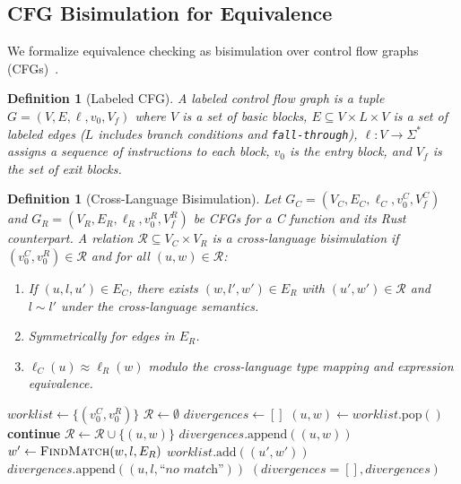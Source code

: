 \documentclass[11pt,a4paper]{article}
\newtheorem{definition}[theorem]{Definition}
\begin{document}
\begin{appendices}
\subsection{CFG Bisimulation for Equivalence}\label{app:bisimulation}

We formalize equivalence checking as bisimulation over control flow
graphs (CFGs)~\cite{park1981concurrency, sangiorgi2011bisimulation}.

\begin{definition}[Labeled CFG]
A labeled control flow graph is a tuple $G = (V, E, \ell, v_0, V_f)$
where $V$ is a set of basic blocks, $E \subseteq V \times L \times V$
is a set of labeled edges ($L$ includes branch conditions and
\texttt{fall-through}), $\ell : V \to \Sigma^*$ assigns a sequence of
instructions to each block, $v_0$ is the entry block, and $V_f$ is the
set of exit blocks.
\end{definition}

\begin{definition}[Cross-Language Bisimulation]
Let $G_C = (V_C, E_C, \ell_C, v_0^C, V_f^C)$ and
$G_R = (V_R, E_R, \ell_R, v_0^R, V_f^R)$ be CFGs for a C function
and its Rust counterpart. A relation $\mathcal{R} \subseteq V_C \times V_R$
is a \emph{cross-language bisimulation} if $(v_0^C, v_0^R) \in \mathcal{R}$
and for all $(u, w) \in \mathcal{R}$:
\begin{enumerate}
  \item If $(u, l, u') \in E_C$, there exists $(w, l', w') \in E_R$ with
    $(u', w') \in \mathcal{R}$ and $l \sim l'$ under the cross-language
    semantics.
  \item Symmetrically for edges in $E_R$.
  \item $\ell_C(u) \approx \ell_R(w)$ modulo the cross-language type
    mapping and expression equivalence.
\end{enumerate}
\end{definition}

\begin{algorithm}[h]
\caption{CFG Bisimulation Check}\label{alg:bisim}
\begin{algorithmic}[1]
  \State $\mathit{worklist} \gets \{(v_0^C, v_0^R)\}$
  \State $\mathcal{R} \gets \emptyset$
  \State $\mathit{divergences} \gets []$
    \State $(u, w) \gets \mathit{worklist}.\text{pop}()$
      \State \textbf{continue}
    \EndIf
    \State $\mathcal{R} \gets \mathcal{R} \cup \{(u, w)\}$
      \State $\mathit{divergences}.\text{append}((u, w))$
    \EndIf
      \State $w' \gets \Call{FindMatch}{w, l, E_R}$
        \State $\mathit{worklist}.\text{add}((u', w'))$
      \Else
        \State $\mathit{divergences}.\text{append}((u, l, \textit{``no match''}))$
      \EndIf
    \EndFor
  \EndWhile
  \State \Return $(\mathit{divergences} = [], \mathit{divergences})$
\EndProcedure
\end{algorithmic}
\end{algorithm}


\end{appendices}
\end{document}
